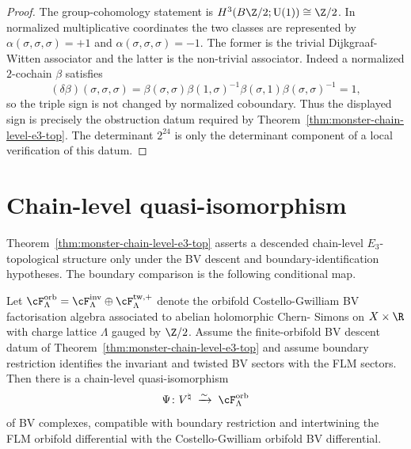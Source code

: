 \begin{proof}
The group-cohomology statement is
$H^3(B\Z/2;\mathrm{U}(1))\cong\Z/2$. In normalized multiplicative
coordinates the two classes are represented by
$\alpha(\sigma,\sigma,\sigma)=+1$ and
$\alpha(\sigma,\sigma,\sigma)=-1$. The former is the trivial
Dijkgraaf-Witten associator and the latter is the non-trivial
associator. Indeed a normalized $2$-cochain $\beta$ satisfies
\[
 (\delta\beta)(\sigma,\sigma,\sigma)
 =
 \beta(\sigma,\sigma)\beta(1,\sigma)^{-1}
 \beta(\sigma,1)\beta(\sigma,\sigma)^{-1}
 =1,
\]
so the triple sign is not changed by normalized coboundary. Thus the
displayed sign is precisely the obstruction datum required by
Theorem~\ref{thm:monster-chain-level-e3-top}. The determinant
$2^{24}$ is only the determinant component of a local verification of
this datum.
\end{proof}

\section{Chain-level quasi-isomorphism}
\label{sec:monster-chain-qi}

Theorem~\ref{thm:monster-chain-level-e3-top} asserts a descended
chain-level $E_3$-topological structure only under the BV descent and
boundary-identification hypotheses. The boundary comparison is the
following conditional map.

\begin{proposition}
\label{prop:monster-flm-chain-qi}
Let $\cF_\Lambda^{\mathrm{orb}} = \cF_\Lambda^{\mathrm{inv}} \oplus
\cF_\Lambda^{\mathrm{tw},+}$ denote the orbifold Costello-Gwilliam
BV factorisation algebra associated to abelian holomorphic Chern-
Simons on $X \times \R$ with charge lattice $\Lambda$ gauged by
$\Z/2$. Assume the finite-orbifold BV descent datum of
Theorem~\ref{thm:monster-chain-level-e3-top} and assume boundary
restriction identifies the invariant and twisted BV sectors with the
FLM sectors. Then there is a chain-level quasi-isomorphism
\[
 \Psi\colon V^\natural
 \;\xrightarrow{\sim}\;
 \cF_\Lambda^{\mathrm{orb}}
\]
of BV complexes, compatible with boundary restriction and intertwining
the FLM orbifold differential with the Costello-Gwilliam orbifold
BV differential.
\end{proposition}

